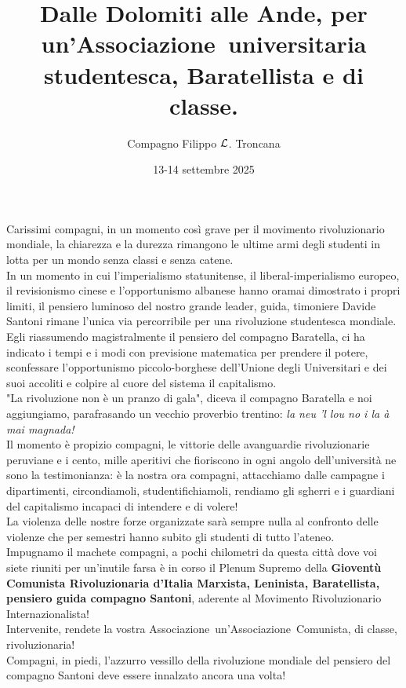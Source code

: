 \documentclass{article}
\title{Dalle Dolomiti alle Ande, per un'Associazione\texttrademark\ universitaria studentesca, Baratellista e di classe.}
\author{Compagno Filippo $\mathcal{L}$. Troncana}
\date{13-14 settembre 2025}
\begin{document}
\maketitle
\large
\begin{multicols}{2}
    Carissimi compagni, in un momento così grave per il movimento rivoluzionario mondiale, la chiarezza e la durezza rimangono le ultime armi degli studenti in lotta per un mondo senza classi e senza catene.\\
    In un momento in cui l'imperialismo statunitense, il liberal-imperialismo europeo, il revisionismo cinese e l'opportunismo albanese hanno oramai dimostrato i propri limiti, il pensiero luminoso del nostro grande leader, guida, timoniere Davide Santoni rimane l'unica via percorribile per una rivoluzione studentesca mondiale.\\
    Egli riassumendo magistralmente il pensiero del compagno Baratella, ci ha indicato i tempi e i modi con previsione matematica per prendere il potere, sconfessare l'opportunismo piccolo-borghese dell'Unione degli Universitari e dei suoi accoliti e colpire al cuore del sistema il capitalismo.\\
    "La rivoluzione non è un pranzo di gala", diceva il compagno Baratella e noi aggiungiamo, parafrasando un vecchio proverbio trentino: \textit{la neu 'l lou no i la à mai magnada!}\\
    Il momento è propizio compagni, le vittorie delle avanguardie rivoluzionarie peruviane e i cento, mille aperitivi che fioriscono in ogni angolo dell'università ne sono la testimonianza: è la nostra ora compagni, attacchiamo dalle campagne i dipartimenti, circondiamoli, studentifichiamoli, rendiamo gli sgherri e i guardiani del capitalismo incapaci di intendere e di volere!\\
    La violenza delle nostre forze organizzate sarà sempre nulla al confronto delle violenze che per semestri hanno subito gli studenti di tutto l'ateneo.\\
    Impugnamo il machete compagni, a pochi chilometri da questa città dove voi siete riuniti per un'inutile farsa è in corso il Plenum Supremo della {\bf Gioventù Comunista Rivoluzionaria d'Italia Marxista, Leninista, Baratellista, pensiero guida compagno Santoni}, aderente al Movimento Rivoluzionario Internazionalista!\\
    Intervenite, rendete la vostra Associazione\texttrademark\ un'Associazione\texttrademark\ Comunista, di classe, rivoluzionaria!\\ Compagni, in piedi, l'azzurro vessillo della rivoluzione mondiale del pensiero del compagno Santoni deve essere innalzato ancora una volta!
\end{multicols}
\end{document}
